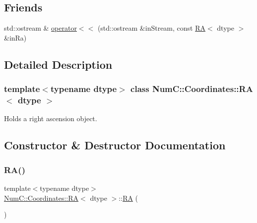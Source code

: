 \subsection*{Friends}
\begin{DoxyCompactItemize}
\item 
std\+::ostream \& \mbox{\hyperlink{class_num_c_1_1_coordinates_1_1_r_a_acba639d6020d3614a9cf1d47587c30fa}{operator$<$$<$}} (std\+::ostream \&in\+Stream, const \mbox{\hyperlink{class_num_c_1_1_coordinates_1_1_r_a}{RA}}$<$ dtype $>$ \&in\+Ra)
\end{DoxyCompactItemize}


\subsection{Detailed Description}
\subsubsection*{template$<$typename dtype$>$\newline
class Num\+C\+::\+Coordinates\+::\+R\+A$<$ dtype $>$}

Holds a right ascension object. 

\subsection{Constructor \& Destructor Documentation}
\mbox{\label{class_num_c_1_1_coordinates_1_1_r_a_a5196fabc335bfd0d3e13c11b9955a08c}} 
\subsubsection{\texorpdfstring{R\+A()}{RA()}\hspace{0.1cm}{\footnotesize\ttfamily [1/3]}}
{\footnotesize\ttfamily template$<$typename dtype$>$ \\
\mbox{\hyperlink{class_num_c_1_1_coordinates_1_1_r_a}{Num\+C\+::\+Coordinates\+::\+RA}}$<$ dtype $>$\+::\mbox{\hyperlink{class_num_c_1_1_coordinates_1_1_r_a}{RA}} (\begin{DoxyParamCaption}{ }\end{DoxyParamCaption})\hspace{0.3cm}{\ttfamily [inline]}}

